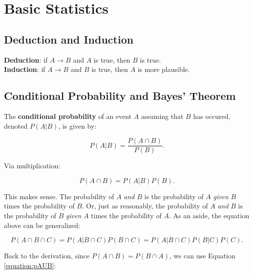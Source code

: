 \section{Basic Statistics}

\subsection{Deduction and Induction}

\textbf{Deduction}: if $A \rightarrow B$ and $A$ is true, then $B$ is true. \\
\textbf{Induction}: if $A \rightarrow B$ and $B$ is true, then $A$ is more plausible. \\

\subsection{Conditional Probability and Bayes' Theorem}

The \textbf{conditional probability} of an event $A$ assuming that $B$ has occured, denoted $P(A|B)$, is given by:

\begin{equation}
P(A|B)=\frac{P(A \cap B)}{P(B)}.
\end{equation}

Via multiplication:

\begin{equation}
P(A \cap B) = P(A|B)P(B).
\label{equation:pAUB}
\end{equation}

This makes sense. The probability of $A$ \textit{and} $B$ is the probability of $A$ \textit{given} $B$ times the probability of $B$. Or, just as reasonably, the probability of $A$ \textit{and} $B$ is the probability of $B$ \textit{given} $A$ times the probability of $A$. As an aside, the equation above can be generalized:

\begin{equation}
P(A \cap B \cap C) = P(A|B \cap C) P(B \cap C) = P(A|B \cap C) P(B|C) P(C).
\end{equation}

Back to the derivation, since $P(A \cap B) = P(B \cap A)$, we can use Equation \ref{equation:pAUB}:

